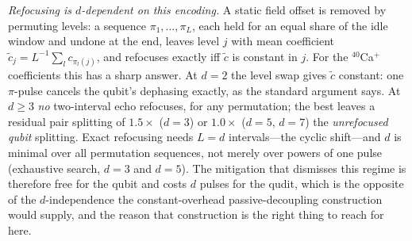 \documentclass[aps,pra,reprint,superscriptaddress,nofootinbib,floatfix]{revtex4-2}
\begin{document}
\emph{Refocusing is $d$-dependent on this encoding.} A static field
offset is removed by permuting levels: a sequence
$\pi_1,\dots,\pi_L$, each held for an equal share of the idle window
and undone at the end, leaves level $j$ with mean coefficient
$\tilde c_j=L^{-1}\sum_l c_{\pi_l(j)}$, and refocuses exactly iff
$\tilde c$ is constant in $j$. For the $^{40}$Ca$^{+}$ coefficients
this has a sharp answer. At $d=2$ the level swap gives $\tilde c$
constant: one $\pi$-pulse cancels the qubit's dephasing exactly, as
the standard argument says. At $d\ge3$ \emph{no} two-interval echo
refocuses, for any permutation; the best leaves a residual pair
splitting of $1.5\times$ ($d=3$) or $1.0\times$ ($d=5$, $d=7$) the
\emph{unrefocused qubit} splitting. Exact refocusing needs $L=d$
intervals---the cyclic shift---and $d$ is minimal over all
permutation sequences, not merely over powers of one pulse
(exhaustive search, $d=3$ and $d=5$). The mitigation that dismisses
this regime is therefore free for the qubit and costs $d$ pulses for
the qudit, which is the opposite of the $d$-independence the
constant-overhead passive-decoupling
construction~\cite{sutherland2023} would supply, and the reason that
construction is the right thing to reach for here.
\end{document}
